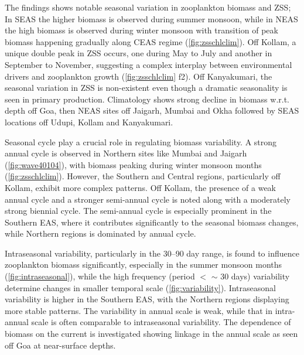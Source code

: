 \documentclass{article}
\begin{document}
	The findings shows notable seasonal variation in zooplankton biomass and ZSS; In SEAS the higher biomass is observed during summer monsoon, while in NEAS the high biomass is observed during winter monsoon with transition of peak biomass happening gradually along CEAS regime (\cref{fig:zsschlclim}). Off Kollam, a unique double peak in ZSS occurs, one during May to July and another in September to November, suggesting a complex interplay between environmental drivers and zooplankton growth (\cref{fig:zsschlclim} f2). Off Kanyakumari, the seasonal variation in ZSS is non-existent even though a dramatic seasonality is seen in primary production. Climatology shows strong decline in biomass w.r.t. depth off Goa, then NEAS sites off Jaigarh, Mumbai and Okha followed by SEAS locations off Udupi, Kollam and Kanyakumari.

	Seasonal cycle play a crucial role in regulating biomass variability. A strong annual cycle is observed in Northern sites like Mumbai and Jaigarh (\cref{fig:wave40104}), with biomass peaking during winter monsoon months (\cref{fig:zsschlclim}). However, the Southern and Central regions, particularly off Kollam, exhibit more complex patterns. Off Kollam, the presence of a weak annual cycle and a stronger semi-annual cycle is noted along with a moderately strong biennial cycle. The semi-annual cycle is especially prominent in the Southern EAS, where it contributes significantly to the seasonal biomass changes, while Northern regions is dominated by annual cycle. 
	
	Intraseasonal variability, particularly in the 30--90 day range, is found to influence zooplankton biomass significantly, especially in the summer monsoon months (\cref{fig:intraseasonal}), while the high frequency (period $<$ $\sim$ 30 days) variability determine changes in smaller temporal scale (\cref{fig:variability}). Intraseasonal variability is higher in the Southern EAS, with the Northern regions displaying more stable patterns. The variability in annual scale is weak, while that in intra-annual scale is often comparable to intraseasonal variability. The dependence of biomass on the current is investigated showing linkage in the annual scale as seen off Goa at near-surface depths. 
	
		
\end{document}

